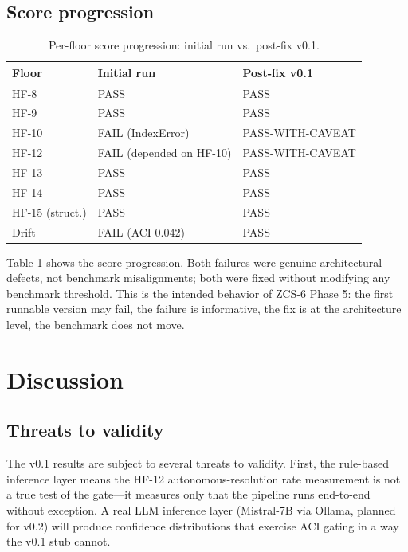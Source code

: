 \documentclass[conference]{IEEEtran}
\theoremstyle{definition}
\theoremstyle{plain}
\theoremstyle{remark}
\begin{document}
\subsection{Score progression}

\begin{table}[t]
\centering
\caption{Per-floor score progression: initial run vs.\ post-fix v0.1.}
\label{tab:progression}
\begin{tabular}{lll}
\toprule
Floor & Initial run & Post-fix v0.1 \\
\midrule
HF-8 & PASS & PASS \\
HF-9 & PASS & PASS \\
HF-10 & FAIL (IndexError) & PASS-WITH-CAVEAT \\
HF-12 & FAIL (depended on HF-10) & PASS-WITH-CAVEAT \\
HF-13 & PASS & PASS \\
HF-14 & PASS & PASS \\
HF-15 (struct.) & PASS & PASS \\
Drift & FAIL (ACI 0.042) & PASS \\
\bottomrule
\end{tabular}
\end{table}

Table \ref{tab:progression} shows the score progression. Both failures were genuine architectural defects, not benchmark misalignments; both were fixed without modifying any benchmark threshold. This is the intended behavior of ZCS-6 Phase 5: the first runnable version may fail, the failure is informative, the fix is at the architecture level, the benchmark does not move.

\section{Discussion}
\label{sec:discussion}

\subsection{Threats to validity}

The v0.1 results are subject to several threats to validity. First, the rule-based inference layer means the HF-12 autonomous-resolution rate measurement is not a true test of the gate---it measures only that the pipeline runs end-to-end without exception. A real LLM inference layer (Mistral-7B via Ollama, planned for v0.2) will produce confidence distributions that exercise ACI gating in a way the v0.1 stub cannot.
\end{document}
